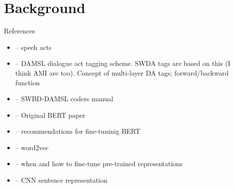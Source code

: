 \documentclass[11pt,a4paper]{article}
\begin{document}
\section{Background} %

References
\begin{itemize}
  \item \citet{austinHowThingsWords2009} -- speeh acts
  \item \citet{coreCodingDialogsDAMSL1997} -- DAMSL dialogue act tagging scheme. SWDA tags are based on this (I think AMI are too). Concept of multi-layer DA tags; forward/backward function
  \item \citet{jurafskySwitchboardSWBDDAMSLShallowDiscourseFunction1997a} -- SWBD-DAMSL coders manual
  \item \citet{devlinBERTPretrainingDeep2018} -- Original BERT paper
  \item \citet{sunHowFineTuneBERT2019} -- recommendations for fine-tuninig BERT
  \item \citet{mikolovDistributedRepresentationsWords2013} -- word2vec
  \item \citet{petersTuneNotTune2019} -- when and how to fine-tune pre-trained representations
  \item \citet{kimConvolutionalNeuralNetworks2014} -- CNN sentence representation
\end{itemize}
\end{document}
